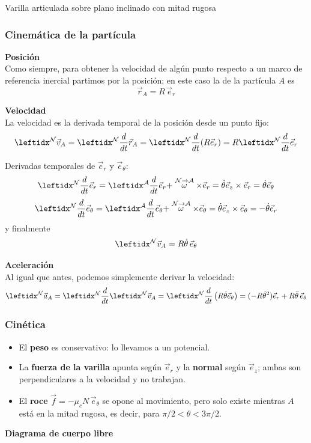 \begin{solucion}{Varilla articulada sobre plano inclinado con mitad rugosa}
\subsubsection*{Cinemática de la partícula}
\textbf{Posición}\\
Como siempre, para obtener la velocidad de algún punto respecto a un marco de referencia inercial partimos por la posición; en este caso la de la partícula $A$ es
$$\vec{r}_A=R\,\vec{e}_r$$

\textbf{Velocidad}\\
La velocidad es la derivada temporal de la posición desde un punto fijo:
$$\marc{\vec{v}_A}{N}=\der{\vec{r}_{A}}{N}=\der{(R\vec{e}_r)}{N}= R\der{\vec{e}_r}{N}{}$$


Derivadas temporales de $\vec{e}_r$ y $\vec{e}_\theta$:
$$\transport{\vec{e}_r}{N}{A}=\dot\theta\vec{e}_z\times\vec{e}_r=\dot\theta\vec{e}_\theta$$
$$\transport{\vec{e}_\theta}{N}{A}=\dot\theta\vec{e}_z\times\vec{e}_\theta=-\dot\theta\vec{e}_r$$
y finalmente
$$\marc{\vec{v}_A}{N}=R\dot\theta\,\vec{e}_\theta$$

\textbf{Aceleración}\\
Al igual que antes, podemos simplemente derivar la velocidad:
$$\marc{\vec{a}_A}{N}=\der{\marc{\vec{v}_A}{N}{}}{N}{}=\der{\left(R\dot\theta\vec{e}_\theta\right)}{N}{}=(-R\dot\theta^2)\vec{e}_r+ R\ddot\theta\,\vec{e}_{\theta}$$

\subsubsection*{Cinética}
\begin{itemize}
    \item El \textbf{peso} es conservativo: lo llevamos a un potencial.
    \item La \textbf{fuerza de la varilla} apunta según $\vec{e}_r$ y la \textbf{normal} según $\vec{e}_z$; ambas son perpendiculares a la velocidad y no trabajan.
    \item El \textbf{roce} $\vec{f}=-\mu_c N\,\vec{e}_\theta$ se opone al movimiento, pero solo existe mientras $A$ está en la mitad rugosa, es decir, para $\pi/2<\theta<3\pi/2$.
\end{itemize}

\textbf{Diagrama de cuerpo libre}
\begin{center}
\end{center}
\end{solucion}
